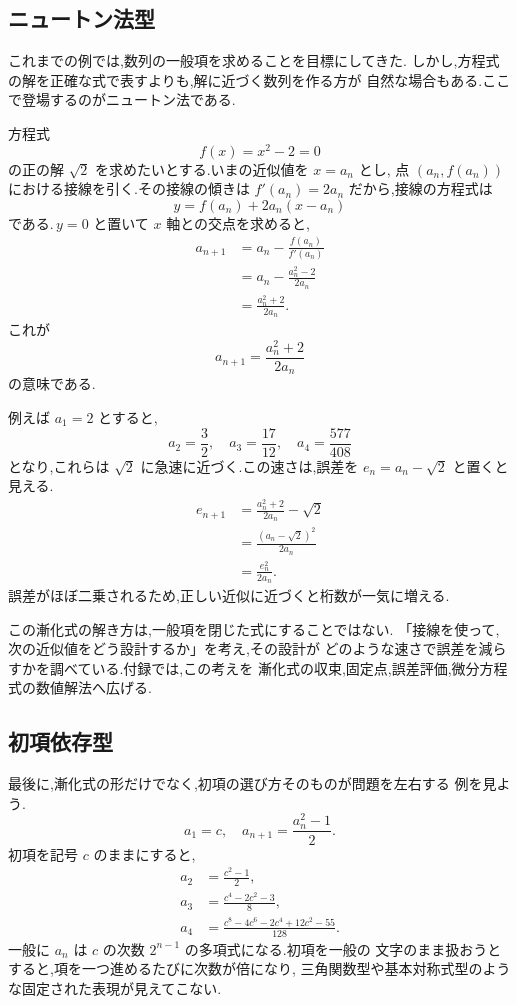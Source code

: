 \subsection{ニュートン法型}

これまでの例では,数列の一般項を求めることを目標にしてきた.
しかし,方程式の解を正確な式で表すよりも,解に近づく数列を作る方が
自然な場合もある.ここで登場するのがニュートン法である.

方程式
\[
  f(x)=x^2-2=0
\]
の正の解 $\sqrt{2}$ を求めたいとする.いまの近似値を $x=a_n$ とし,
点 $(a_n,f(a_n))$ における接線を引く.その接線の傾きは
$f'(a_n)=2a_n$ だから,接線の方程式は
\[
  y=f(a_n)+2a_n(x-a_n)
\]
である.\,$y=0$ と置いて $x$ 軸との交点を求めると,
\begin{align*}
  a_{n+1}
    &=a_n-\frac{f(a_n)}{f'(a_n)}\\
    &=a_n-\frac{a_n^2-2}{2a_n}\\
    &=\frac{a_n^2+2}{2a_n}.
\end{align*}
これが
\[
  a_{n+1}=\frac{a_n^2+2}{2a_n}
\]
の意味である.

例えば $a_1=2$ とすると,
\[
  a_2=\frac{3}{2},
  \quad
  a_3=\frac{17}{12},
  \quad
  a_4=\frac{577}{408}
\]
となり,これらは $\sqrt{2}$ に急速に近づく.この速さは,誤差を
$e_n=a_n-\sqrt{2}$ と置くと見える.
\begin{align*}
  e_{n+1}
    &=\frac{a_n^2+2}{2a_n}-\sqrt{2}\\
    &=\frac{(a_n-\sqrt{2})^2}{2a_n}\\
    &=\frac{e_n^2}{2a_n}.
\end{align*}
誤差がほぼ二乗されるため,正しい近似に近づくと桁数が一気に増える.

この漸化式の解き方は,一般項を閉じた式にすることではない.
「接線を使って,次の近似値をどう設計するか」を考え,その設計が
どのような速さで誤差を減らすかを調べている.付録では,この考えを
漸化式の収束,固定点,誤差評価,微分方程式の数値解法へ広げる.

\subsection{初項依存型}

最後に,漸化式の形だけでなく,初項の選び方そのものが問題を左右する
例を見よう.
\[
  a_1=c,
  \quad
  a_{n+1}=\frac{a_n^2-1}{2}.
\]
初項を記号 $c$ のままにすると,
\begin{align*}
  a_2&=\frac{c^2-1}{2},\\
  a_3&=\frac{c^4-2c^2-3}{8},\\
  a_4&=\frac{c^8-4c^6-2c^4+12c^2-55}{128}.
\end{align*}
一般に $a_n$ は $c$ の次数 $2^{n-1}$ の多項式になる.初項を一般の
文字のまま扱おうとすると,項を一つ進めるたびに次数が倍になり,
三角関数型や基本対称式型のような固定された表現が見えてこない.

